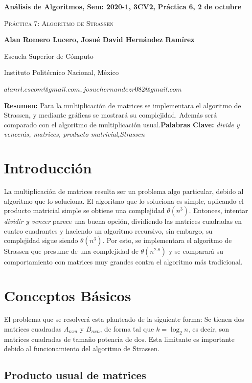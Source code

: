 \documentclass[12pt,twoside]{article}
\date{}
\begin{document}
\centerline{\bf An\'alisis de Algoritmos, Sem: 2020-1, 3CV2, Pr\'actica 6, 2 de octubre}
\centerline{}
\centerline{}
\begin{center}
\Large{\textsc{Pr\'actica 7: Algoritmo de Strassen}}
\end{center}
\centerline{\bf{Alan Romero Lucero, Josu\'e David Hern\'andez Ram\'irez}}
\centerline{}
\centerline{Escuela Superior de C\'omputo}
\centerline{Instituto Polit\'ecnico Nacional, M\'exico}
\centerline{$alanrl.escom@gmail.com, josuehernandezr082@gmail.com$}
\newtheorem{Theorem}{\quad Theorem}[section]
\newtheorem{Definition}[Theorem]{\quad Definition}
\newtheorem{Corollary}[Theorem]{\quad Corollary}
\newtheorem{Lemma}[Theorem]{\quad Lemma}
\newtheorem{Example}[Theorem]{\quad Example}
\bigskip
\textbf{Resumen:} Para la multiplicaci\'on de matrices se implementara el algoritmo de Strassen, y mediante gr\'aficas se mostrar\'a su complejidad. Adem\'as ser\'a comparado con el algoritmo de multiplicaci\'on usual.{\bf Palabras Clave:} {\textit{divide y vencer\'as, matrices, producto matricial,Strassen}}
\section{Introducci\'on}

La multiplicaci\'on de matrices resulta ser un problema algo particular, debido al algoritmo que lo soluciona. El algoritmo que lo soluciona es simple, aplicando el producto matricial simple se obtiene una complejidad $\theta(n^3)$. Entonces, intentar \textit{dividir y vencer} parece una buena opci\'on, dividiendo las matrices cuadradas en cuatro cuadrantes y haciendo un algoritmo recursivo, sin embargo, su complejidad sigue siendo $\theta(n^3)$. Por esto, se implementara el algoritmo de Strassen que presume de una complejidad de $\theta(n^2.8)$ y se comparar\'a su comportamiento con matrices muy grandes contra el algoritmo m\'as tradicional.

\section{Conceptos B\'asicos}

El problema que se resolver\'a esta planteado de la siguiente forma: Se tienen dos matrices cuadradas \textit{$A_{nxn}$} y \textit{$B_{nxn}$}, de forma tal que $k = \log_2{n}$, es decir, son matrices cuadradas de tama\~no potencia de dos. Esta limitante es importante debido al funcionamiento del algoritmo de Strassen.

\subsection{Producto usual de matrices}
\end{document}
